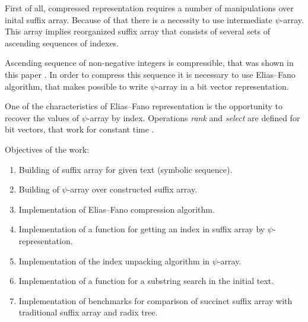 First of all, compressed representation requires a number of manipulations over inital suffix array.
Because of that there is a necessity to use intermediate $\psi$-array.
This array implies reorganized suffix array that consists of several sets of ascending sequences of indexes.

Ascending sequence of non-negative integers is compressible, that was shown in this paper \cite{pibiri2014dynamic}.
In order to compress this sequence it is necessary to use Elias--Fano algorithm, that makes possible to
write $\psi$-array in a bit vector representation.

One of the characteristics of Elias--Fano representation is the opportunity to recover the values of $\psi$-array
by index. Operations \emph{rank} and \emph{select} are defined for bit vectors,
that work for constant time \cite{farina2009rank}.

Objectives of the work:

\begin{enumerate}
    \item Building of suffix array for given text (symbolic sequence).
    \item Building of $\psi$-array over constructed suffix array.
    \item Implementation of Elias--Fano compression algorithm.
    \item Implementation of a function for getting an index in suffix array by $\psi$-representation.
    \item Implementation of the index unpacking algorithm in $\psi$-array.
    \item Implementation of a function for a substring search in the initial text.
    \item Implementation of benchmarks for comparison of succinct suffix array with
    traditional suffix array and radix tree.
\end{enumerate}

